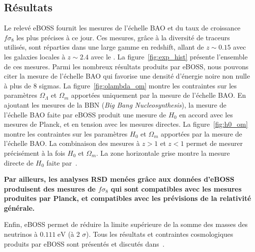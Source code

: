 \subsection{Résultats}
Le relevé eBOSS fournit les mesures de l'échelle BAO et du taux de croissance $f \sigma_8$ les plus précises à ce jour. Ces mesures, grâce à la diversité de traceurs utilisés, sont réparties dans une large gamme en redshift, allant de $z \sim 0.15$ avec les galaxies locales à $z \sim 2.4$ avec le \lya{}.
La figure~\ref{fig:exp_hist} présente l'ensemble de ces mesures.
Parmi les nombreux résultats produits par eBOSS, nous pouvons citer la mesure de l'échelle BAO qui favorise une densité d'énergie noire non nulle à plus de 8 sigmas. %
La figure~\ref{fig:olambda_om} montre les contraintes sur les paramètres $\Omega_{\Lambda}$ et $\Omega_{m}$ apportées uniquement par la mesure de l'échelle BAO.
En ajoutant les mesures de la BBN (\emph{Big Bang Nucleosynthesis}), la mesure de l'échelle BAO faite par eBOSS produit une mesure de $H_0$ en accord avec les mesures de Planck, et en tension avec les mesures directes.
La figure~\ref{fig:h0_om} montre les contraintes sur les paramètres $H_0$ et $\Omega_{m}$ apportées par la mesure de l'échelle BAO. La combinaison des mesures à $z > 1$ et $z < 1$ permet de mesurer précisément à la fois $H_0$ et $\Omega_{m}$. La zone horizontale grise montre la mesure directe de $H_0$ faite par~\textcite{Riess2019}.

\textbf{Par ailleurs, les analyses RSD menées grâce aux données d'eBOSS produisent des mesures de $f\sigma_8$ qui sont compatibles avec les mesures produites par Planck, et compatibles avec les prévisions de la relativité générale.}

Enfin, eBOSS permet de réduire la limite supérieure de la somme des masses des neutrinos à $\num{0.111}\; \mathrm{eV}$ (à 2 $\sigma$).
Tous les résultats et contraintes cosmologiques produits par eBOSS sont présentés et discutés dans~\textcite{Collaboration2020}.


